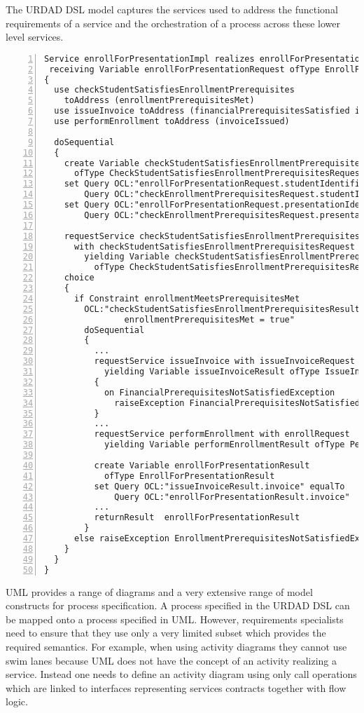 The URDAD DSL model captures the services used to address the functional requirements of a service and the orchestration of a process across these lower level services.
\tiny \begin{lstlisting}[numbers=left,escapechar=|]
Service enrollForPresentationImpl realizes enrollForPresentation 
 receiving Variable enrollForPresentationRequest ofType EnrollForPresentationRequest
{
  use checkStudentSatisfiesEnrollmentPrerequisites 
    toAddress (enrollmentPrerequisitesMet)
  use issueInvoice toAddress (financialPrerequisitesSatisfied invoiceIssued) 
  use performEnrollment toAddress (invoiceIssued)
   
  doSequential
  {
    create Variable checkStudentSatisfiesEnrollmentPrerequisitesRequest 
      ofType CheckStudentSatisfiesEnrollmentPrerequisitesRequest               
    set Query OCL:"enrollForPresentationRequest.studentIdentifier" equalTo 
        Query OCL:"checkEnrollmentPrerequisitesRequest.studentIdentifier"
    set Query OCL:"enrollForPresentationRequest.presentationIdentifier" equalTo
        Query OCL:"checkEnrollmentPrerequisitesRequest.presentationIdentifier"
                     
    requestService checkStudentSatisfiesEnrollmentPrerequisites 
      with checkStudentSatisfiesEnrollmentPrerequisitesRequest 
        yielding Variable checkStudentSatisfiesEnrollmentPrerequisitesResult
          ofType CheckStudentSatisfiesEnrollmentPrerequisitesResult
    choice
    {
      if Constraint enrollmentMeetsPrerequisitesMet 
        OCL:"checkStudentSatisfiesEnrollmentPrerequisitesResult.
                enrollmentPrerequisitesMet = true"
        doSequential
        {
          ...
          requestService issueInvoice with issueInvoiceRequest 
            yielding Variable issueInvoiceResult ofType IssueInvoiceResult
          {
            on FinancialPrerequisitesNotSatisfiedException 
              raiseException FinancialPrerequisitesNotSatisfiedException
          }
	      ...
          requestService performEnrollment with enrollRequest 
            yielding Variable performEnrollmentResult ofType PerformEnrollmentResult
          
          create Variable enrollForPresentationResult 
            ofType EnrollForPresentationResult
          set Query OCL:"issueInvoiceResult.invoice" equalTo
              Query OCL:"enrollForPresentationResult.invoice"
          ...                       
          returnResult  enrollForPresentationResult
        }
      else raiseException EnrollmentPrerequisitesNotSatisfiedException
    }
  }
}                 
\end{lstlisting}\normalsize
UML provides a range of diagrams and a very extensive range of model constructs for process specification. A process specified in the URDAD DSL can be mapped onto a process specified in UML. However, requirements specialists need to ensure that they use only a very limited subset which provides the required semantics. For example, when using activity diagrams they cannot use swim lanes because UML does not have the concept of an activity realizing a service. Instead one needs to define an activity diagram using only call operations which are linked to interfaces representing services contracts together with flow logic.

